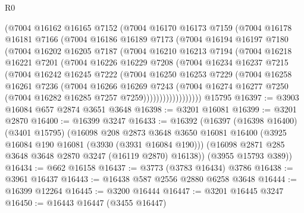 \begin{lexlean}{R0}
\begin{coremodule}
        (@7004
          @16162
          @16165
          @7152
          (@7004
            @16170
            @16173
            @7159
            (@7004
              @16178
              @16181
              @7166
              (@7004
                @16186
                @16189
                @7173
                (@7004
                  @16194
                  @16197
                  @7180
                  (@7004
                    @16202
                    @16205
                    @7187
                    (@7004
                      @16210
                      @16213
                      @7194
                      (@7004
                        @16218
                        @16221
                        @7201
                        (@7004
                          @16226
                          @16229
                          @7208
                          (@7004
                            @16234
                            @16237
                            @7215
                            (@7004
                              @16242
                              @16245
                              @7222
                              (@7004
                                @16250
                                @16253
                                @7229
                                (@7004
                                  @16258
                                  @16261
                                  @7236
                                  (@7004
                                    @16266
                                    @16269
                                    @7243
                                    (@7004
                                      @16274
                                      @16277
                                      @7250
                                      (@7004 @16282 @16285 @7257 @7259))))))))))))))))))
    @15795
@16397 := @3903 @16084 @657 @2874 @3651 @3648
@16398 := @3201 @16081
@16399 := @3201 @2870
@16400 := @16399 @3247
@16433 := @16392
    (@16397
      (@16398 @16400)
      (@3401 @15795)
      (@16098
        @208
        @2873
        @3648
        @3650
        @16081
        @16400
        (@3925 @16084 @190 @16081 (@3930 (@3931 @16084 @190)))
        (@16098 @2871 @285 @3648 @3648 @2870 @3247 (@16119 @2870) @16138))
      (@3955 @15793 @389))
@16434 := @662 @16158
@16437 := @3773 (@3783 @16434) @3786
@16438 := @3961 @16437
@16443 := @16438 @587 @2556 @2880 @6258 @3648
@16444 := @16399 @12264
@16445 := @3200 @16444
@16447 := @3201 @16445 @3247
@16450 := @16443 @16447 (@3455 @16447)

\end{coremodule}
\end{lexlean}
